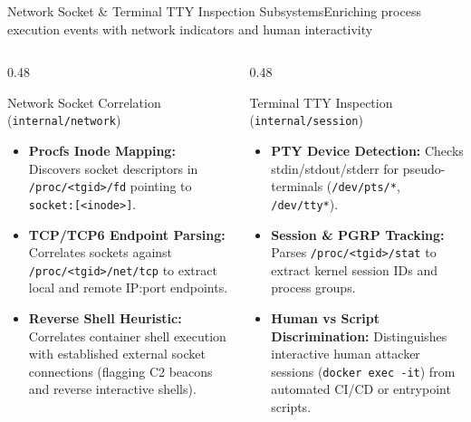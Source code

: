 \documentclass[aspectratio=169,10pt]{beamer}
\begin{document}
\begin{frame}{Network Socket \& Terminal TTY Inspection Subsystems}{Enriching process execution events with network indicators and human interactivity}
  \begin{columns}[T]
    \begin{column}{0.48\textwidth}
      \begin{block}{Network Socket Correlation (\texttt{internal/network})}
        \scriptsize
        \begin{itemize}
          \item \textbf{Procfs Inode Mapping:} Discovers socket descriptors in \texttt{/proc/<tgid>/fd} pointing to \texttt{socket:[<inode>]}.
          \item \textbf{TCP/TCP6 Endpoint Parsing:} Correlates sockets against \texttt{/proc/<tgid>/net/tcp} to extract local and remote IP:port endpoints.
          \item \textbf{Reverse Shell Heuristic:} Correlates container shell execution with established external socket connections (flagging C2 beacons and reverse interactive shells).
        \end{itemize}
      \end{block}
    \end{column}

    \begin{column}{0.48\textwidth}
      \begin{exampleblock}{Terminal TTY Inspection (\texttt{internal/session})}
        \scriptsize
        \begin{itemize}
          \item \textbf{PTY Device Detection:} Checks stdin/stdout/stderr for pseudo-terminals (\texttt{/dev/pts/*}, \texttt{/dev/tty*}).
          \item \textbf{Session \& PGRP Tracking:} Parses \texttt{/proc/<tgid>/stat} to extract kernel session IDs and process groups.
          \item \textbf{Human vs Script Discrimination:} Distinguishes interactive human attacker sessions (\texttt{docker exec -it}) from automated CI/CD or entrypoint scripts.
        \end{itemize}
      \end{exampleblock}
    \end{column}
  \end{columns}
\end{frame}
\end{document}
